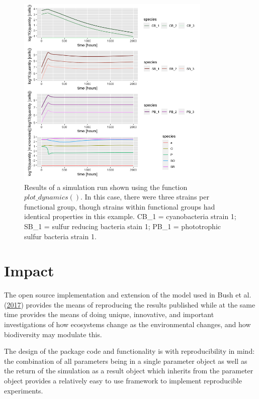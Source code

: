 \documentclass[
]{article}
\begin{document}
\begin{figure}

{\centering \includegraphics[width=350px]{figures/ug_three_strains_dynamics} 

}

\caption{Results of a simulation run shown using the function $plot\_dynamics()$. In this case, there were three strains per functional group, though strains within functional groups had identical properties in this example. CB\_1 = cyanobacteria strain 1; SB\_1 = sulfur reducing bacteria stain 1; PB\_1 = phototrophic sulfur bacteria strain 1.}\label{fig:plot-dynamics}
\end{figure}

\hypertarget{impact}{%
\section{Impact}\label{impact}}

The open source implementation and extension of the model used in Bush et al. (\protect\hyperlink{ref-Bush2017}{2017}) provides the means of reproducing the results published while at the same time provides the means of doing unique, innovative, and important investigations of how ecosystems change as the environmental changes, and how biodiversity may modulate this.

The design of the package code and functionality is with reproducibility in mind: the combination of all parameters being in a single parameter object as well as the return of the simulation as a result object which inherits from the parameter object provides a relatively easy to use framework to implement reproducible experiments.
\end{document}
